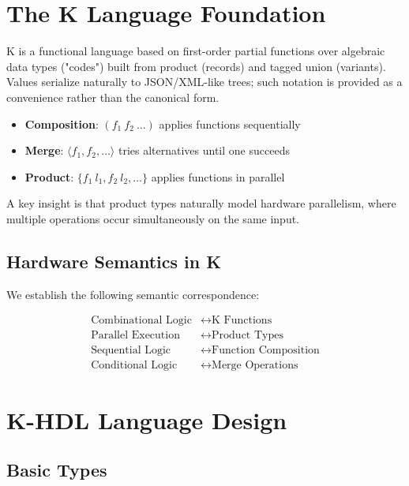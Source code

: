 \documentclass[10pt,twocolumn]{article}
\begin{document}
\section{The K Language Foundation}

K is a functional language based on first-order partial functions over algebraic data types ("codes") built from product (records) and tagged union (variants). Values serialize naturally to JSON/XML-like trees; such notation is provided as a convenience rather than the canonical form.

\begin{itemize}
\item \textbf{Composition}: $(f_1\ f_2\ \ldots)$ applies functions sequentially
\item \textbf{Merge}: $\langle f_1, f_2, \ldots \rangle$ tries alternatives until one succeeds
\item \textbf{Product}: $\{f_1\ l_1, f_2\ l_2, \ldots\}$ applies functions in parallel
\end{itemize}

A key insight is that product types naturally model hardware parallelism, where multiple operations occur simultaneously on the same input.

\subsection{Hardware Semantics in K}

We establish the following semantic correspondence:

\begin{align}
\text{Combinational Logic} &\leftrightarrow \text{K Functions}\\
\text{Parallel Execution} &\leftrightarrow \text{Product Types}\\
\text{Sequential Logic} &\leftrightarrow \text{Function Composition}\\
\text{Conditional Logic} &\leftrightarrow \text{Merge Operations}
\end{align}

\section{K-HDL Language Design}

\subsection{Basic Types}
\end{document}
